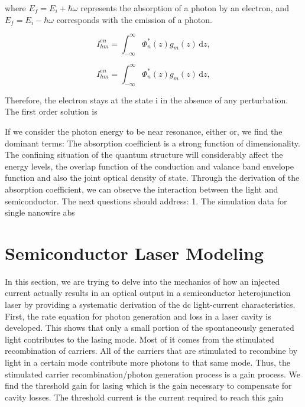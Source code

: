 where $E_f = E_i+ \hbar\omega$ represents the absorption of a photon by an electron, and $E_f = E_i - \hbar\omega$ corresponds with the emission of a photon.

\begin{equation}
  {I_{hm}^{en}}=\int_{-\infty}^\infty{\Phi_n^\ast}(z){g_m(z)}\,\mathrm{d}z,
\end{equation}

\begin{equation}
{I_{hm}^{en}}=\int_{-\infty}^\infty{\Phi_n^\ast}(z){g_m(z)}\,\mathrm{d}z,
\label{eq:seven}
\end{equation}

Therefore, the electron stays at the state i in the absence of any
perturbation. The first order solution is 

If we consider the photon energy to be near resonance, either  or, we find the
dominant terms: The absorption coefficient is a strong function of
dimensionality. The confining situation of the quantum structure will
considerably affect the energy levels, the overlap function of the conduction
and valance band envelope function and also the joint optical density of state.
Through the derivation of the absorption coefficient, we can observe the
interaction between the light and semiconductor.  The next questions should
address: 1. The simulation data for single nanowire abs

\chapter{Semiconductor Laser Modeling}
\label{sec:model}

In this section, we are trying to delve into the mechanics of how an injected
current actually results in an optical output in a semiconductor heterojunction
laser by providing a systematic derivation of the dc light-current
characteristics. First, the rate equation for photon generation and loss in a
laser cavity is developed. This shows that only a small portion of the
spontaneously generated light contributes to the lasing mode. Most of it comes
from the stimulated recombination of carriers. All of the carriers that are
stimulated to recombine by light in a certain mode contribute more photons to
that same mode. Thus, the stimulated carrier recombination/photon generation
process is a gain process. We find the threshold gain for lasing which is the
gain necessary to compensate for cavity losses. The threshold current is the
current required to reach this gain 

